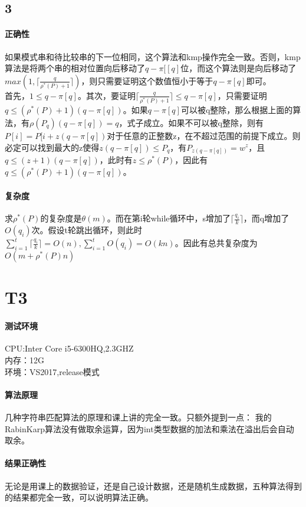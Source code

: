 \documentclass{article}
\begin{document}
\begin{CJK}{UTF8}{gkai}
\subsection{3}
\paragraph{正确性}
如果模式串和待比较串的下一位相同，这个算法和kmp操作完全一致。否则，kmp算法是将两个串的相对位置向后移动了$q-\pi[[q]$位，而这个算法则是向后移动了$max(1,\lceil \frac{q}{\rho^{*}(P)+1}\rceil )$，则只需要证明这个数值恒小于等于$q-\pi[q]$即可。\\
首先，$1\leq q-\pi[q] $。其次，要证明$\lceil \frac{q}{\rho^{*}(P)+1}\rceil \leq q-\pi[q]$，只需要证明$q \leq (\rho^{*}(P)+1)(q-\pi[q])$。如果$q - \pi[q]$可以被q整除，那么根据上面的算法，有$\rho(P_{q})(q-\pi[q])=q$，式子成立。如果不可以被q整除，则有$P[i]=P[i+z(q-\pi[q])$对于任意的正整数z，在不超过范围的前提下成立。则必定可以找到最大的z使得$z(q-\pi[q])\leq P_{q}$，有$P_{z(q-\pi[q])}=w^{z}$，且$q\leq(z+1)(q-\pi[q])$，此时有$z\leq \rho^{*}(P)$，因此有$q \leq (\rho^{*}(P)+1)(q-\pi[q])$。
\paragraph{复杂度}
求$\rho^{*}(P)$的复杂度是$\theta(m)$。而在第i轮while循环中，s增加了$\lceil\frac{q_{i}}{k}\rceil$，而q增加了$O(q_{i})$次。假设t轮跳出循环，则此时$\sum_{i=1}^{t}\lceil\frac{q_{i}}{k}\rceil = O(n),\sum_{i=1}^{t}O(q_{i}) =O(kn)$。因此有总共复杂度为$O(m+\rho^{*}(P)n)$
\section{T3} 
\paragraph{测试环境}
CPU:Inter Core i5-6300HQ,2.3GHZ\\
内存：12G\\
环境：VS2017,release模式
\paragraph{算法原理}
几种字符串匹配算法的原理和课上讲的完全一致。只额外提到一点：
我的RabinKarp算法没有做取余运算，因为int类型数据的加法和乘法在溢出后会自动取余。
\paragraph{结果正确性}
无论是用课上的数据验证，还是自己设计数据，还是随机生成数据，五种算法得到的结果都完全一致，可以说明算法正确。

\end{CJK}
\end{document}
